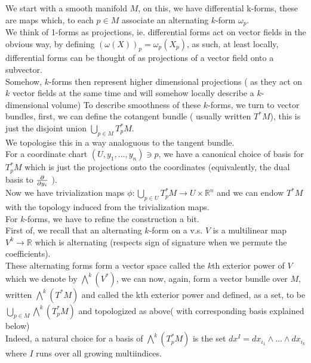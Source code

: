 \documentclass[../main.tex]{subfiles}
\begin{document}
We start with a smooth manifold $M$, on this, we have differential k-forms, these are maps which, to each $p \in M$ associate an alternating $k$-form $ \omega_p$.\\
We think of 1-forms as projections, ie. differential forms act on vector fields in the obvious way, by defining $\left( \omega( X)  \right)_p = \omega_p( X_p) $, as such, at least locally, differential forms can be thought of as projections of a vector field onto a subvector.\\
Somehow, $k$-forms then represent higher dimensional projections ( as they act on $k$ vector fields at the same time and will somehow locally describe a $k$-dimensional volume) 
To describe smoothness of these $k$-forms, we turn to vector bundles, first, we can define the cotangent bundle ( usually written $T^{\ast}M$), this is just the disjoint union  $\bigcup_{p \in M} T_p^{\ast}M$.\\
We topologise this in a way analoguous to the tangent bundle.\\
For a coordinate chart $( U, y_1,\ldots, y_n)\ni p $, we have a canonical choice of basis for $T_p^{*}M$ which is just the projections onto the coordinates (equivalently, the dual basis to $ \frac{\partial }{\partial y_i}$ ).\\
Now we have trivialization maps $\phi: \bigcup_{p \in U} T_p^{* }M \to U \times \mathbb{R}^{n}$ and we can endow $T^{*}M$ with the topology induced from the trivialization maps.\\

For $k$-forms, we have to refine the construction a bit.\\
First of, we recall that an alternating $k$-form on a v.s. $V$ is a multilinear map $ V^{k}\to \mathbb{R}$ which is alternating (respects sign of signature when we permute the coefficients).\\
These alternating forms form a vector space called the $k$th exterior power of $V$ which we denote by $\bigwedge^{k}( V^{*}) $, we can now, again, form a vector bundle over $M$, written $\bigwedge^{k}( T^{*}M) $ and called the kth exterior power and defined, as a set, to be $ \bigcup_{p \in M} \bigwedge^{k}( T^{*}_pM) $ and topologized as above( with corresponding basis explained below) \\
Indeed, a natural choice for a basis of $\bigwedge^{k}( T^{*}_p M) $ is the set $dx^{I}= dx_{i_1} \wedge \ldots \wedge dx_{i_k} $ where $I$ runs over all growing multiindices.\\
\end{document}
